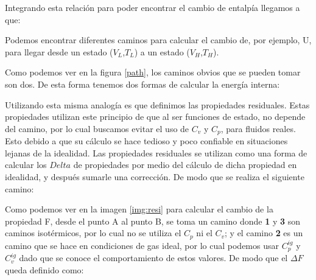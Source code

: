 Integrando esta relación para poder encontrar el cambio de entalpía llegamos a que:


Podemos encontrar diferentes caminos para calcular el cambio de, por ejemplo, U, para llegar desde un estado ($V_L$,$T_L$) a un estado ($V_H$,$T_H$).

Como podemos ver en la figura \ref{path}, los caminos obvios que se pueden tomar son dos.
De esta forma tenemos dos formas de calcular la energía interna:


Utilizando esta misma analogía es que definimos las propiedades residuales. Estas propiedades utilizan este principio de que al ser funciones de estado, no depende del camino, por lo cual buscamos evitar el uso de $C_v$ y $C_p$, para fluidos reales. Esto debido a que su cálculo se hace tedioso y poco confiable en situaciones lejanas de la idealidad.
Las propiedades residuales se utilizan como una forma de calcular los $Delta$ de propiedades por medio del cálculo de dicha propiedad en idealidad, y después sumarle una corrección.
De modo que se realiza el siguiente camino:


Como podemos ver en la imagen \ref{img:resi} para calcular el cambio de la propiedad F, desde el punto A al punto B, se toma un camino donde \textbf{1} y \textbf{3} son caminos isotérmicos, por lo cual no se utiliza el $C_p$ ni el $C_v$; y el camino \textbf{2} es un camino que se hace en condiciones de gas ideal, por lo cual podemos usar $C_p^{ig}$ y $C_v^{ig}$ dado que se conoce el comportamiento de estos valores.
De modo que el $\Delta F$ queda definido como:


